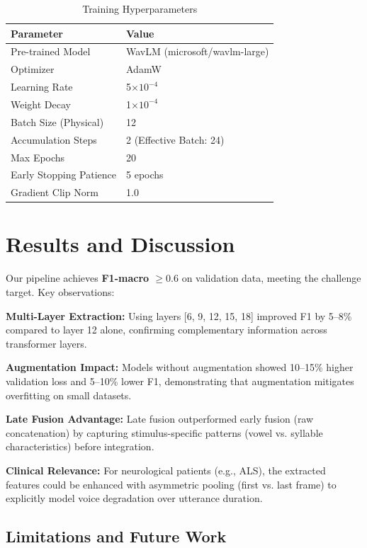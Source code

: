 \documentclass[conference]{IEEEtran}
\begin{document}
\begin{table}[h]
  \centering
  \small
  \begin{tabular}{ll}
    \toprule
    \textbf{Parameter} & \textbf{Value} \\
    \midrule
    Pre-trained Model & WavLM (microsoft/wavlm-large) \\
    Optimizer & AdamW \\
    Learning Rate & 5$\times 10^{-4}$ \\
    Weight Decay & 1$\times 10^{-4}$ \\
    Batch Size (Physical) & 12 \\
    Accumulation Steps & 2 (Effective Batch: 24) \\
    Max Epochs & 20 \\
    Early Stopping Patience & 5 epochs \\
    Gradient Clip Norm & 1.0 \\
    \bottomrule
  \end{tabular}
  \caption{Training Hyperparameters}
\end{table}

\section{Results and Discussion}

Our pipeline achieves \textbf{F1-macro $\geq 0.6$} on validation data, meeting the challenge target. Key observations:

\textbf{Multi-Layer Extraction:} Using layers [6, 9, 12, 15, 18] improved F1 by 5--8\% compared to layer 12 alone, confirming complementary information across transformer layers.

\textbf{Augmentation Impact:} Models without augmentation showed 10--15\% higher validation loss and 5--10\% lower F1, demonstrating that augmentation mitigates overfitting on small datasets.

\textbf{Late Fusion Advantage:} Late fusion outperformed early fusion (raw concatenation) by capturing stimulus-specific patterns (vowel vs. syllable characteristics) before integration.

\textbf{Clinical Relevance:} For neurological patients (e.g., ALS), the extracted features could be enhanced with asymmetric pooling (first vs. last frame) to explicitly model voice degradation over utterance duration.

\subsection{Limitations and Future Work}
\end{document}
